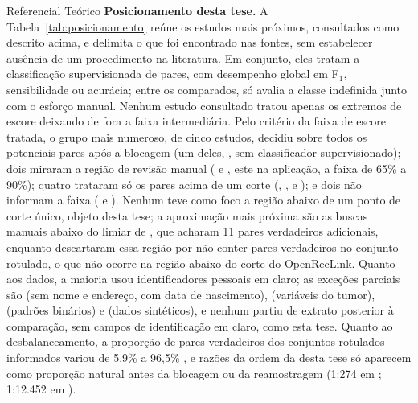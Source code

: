 \begin{chapter}{Referencial Teórico}
\textbf{Posicionamento desta tese.} A Tabela~\ref{tab:posicionamento} reúne os estudos mais próximos, consultados como descrito acima, e delimita o que foi encontrado nas fontes, sem estabelecer ausência de um procedimento na literatura. Em conjunto, eles tratam a classificação supervisionada de pares, com desempenho global em F$_1$, sensibilidade ou acurácia; entre os comparados, só  avalia a classe indefinida junto com o esforço manual. Nenhum estudo consultado tratou apenas os extremos de escore deixando de fora a faixa intermediária. Pelo critério da faixa de escore tratada, o grupo mais numeroso, de cinco estudos, decidiu sobre todos os potenciais pares após a blocagem (um deles, , sem classificador supervisionado); dois miraram a região de revisão manual ( e , este na aplicação, a faixa de 65\% a 90\%); quatro trataram só os pares acima de um corte (, ,  e ); e dois não informam a faixa ( e ). Nenhum teve como foco a região abaixo de um ponto de corte único, objeto desta tese; a aproximação mais próxima são as buscas manuais abaixo do limiar de , que acharam 11 pares verdadeiros adicionais, enquanto  descartaram essa região por não conter pares verdadeiros no conjunto rotulado, o que não ocorre na região abaixo do corte do OpenRecLink. Quanto aos dados, a maioria usou identificadores pessoais em claro; as exceções parciais são  (sem nome e endereço, com data de nascimento),  (variáveis do tumor),  (padrões binários) e  (dados sintéticos), e nenhum partiu de extrato posterior à comparação, sem campos de identificação em claro, como esta tese. Quanto ao desbalanceamento, a proporção de pares verdadeiros dos conjuntos rotulados informados variou de 5,9\% \cite{McNutt2020comparison} a 96,5\% \cite{Paiva2025comparador}, e razões da ordem da desta tese só aparecem como proporção natural antes da blocagem ou da reamostragem (1:274 em ; 1:12.452 em ).


\end{chapter}
